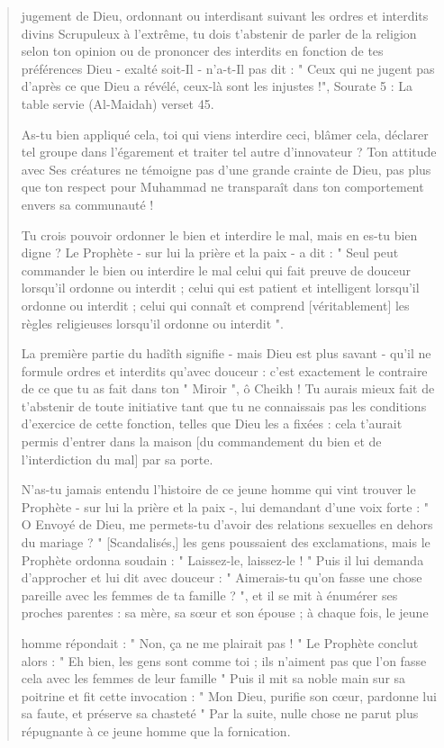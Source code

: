 \begin{quote}
jugement de Dieu, ordonnant ou interdisant suivant les ordres et
interdits divins Scrupuleux à l'extrême, tu dois t'abstenir de parler de
la religion selon ton opinion ou de prononcer des interdits en fonction
de tes préférences Dieu - exalté soit-Il - n'a-t-Il pas dit : " Ceux qui
ne jugent pas d'après ce que Dieu a révélé, ceux-là sont les injustes
!", Sourate 5 : La table servie (Al-Maidah) verset 45.

As-tu bien appliqué cela, toi qui viens interdire ceci, blâmer cela,
déclarer tel groupe dans l'égarement et traiter tel autre d'innovateur ?
Ton attitude avec Ses créatures ne témoigne pas d'une grande crainte de
Dieu, pas plus que ton respect pour Muhammad ne transparaît dans ton
comportement envers sa communauté !

Tu crois pouvoir ordonner le bien et interdire le mal, mais en es-tu
bien digne ? Le Prophète - sur lui la prière et la paix - a dit : " Seul
peut commander le bien ou interdire le mal celui qui fait preuve de
douceur lorsqu'il ordonne ou interdit ; celui qui est patient et
intelligent lorsqu'il ordonne ou interdit ; celui qui connaît et
comprend {[}véritablement{]} les règles religieuses lorsqu'il ordonne ou
interdit ".

La première partie du hadîth signifie - mais Dieu est plus savant -
qu'il ne formule ordres et interdits qu'avec douceur : c'est exactement
le contraire de ce que tu as fait dans ton " Miroir ", ô Cheikh ! Tu
aurais mieux fait de t'abstenir de toute initiative tant que tu ne
connaissais pas les conditions d'exercice de cette fonction, telles que
Dieu les a fixées : cela t'aurait permis d'entrer dans la maison {[}du
commandement du bien et de l'interdiction du mal{]} par sa porte.

N'as-tu jamais entendu l'histoire de ce jeune homme qui vint trouver le
Prophète - sur lui la prière et la paix -, lui demandant d'une voix
forte : " O Envoyé de Dieu, me permets-tu d'avoir des relations
sexuelles en dehors du mariage ? " {[}Scandalisés,{]} les gens
poussaient des exclamations, mais le Prophète ordonna soudain : "
Laissez-le, laissez-le ! " Puis il lui demanda d'approcher et lui dit
avec douceur : " Aimerais-tu qu'on fasse une chose pareille avec les
femmes de ta famille ? ", et il se mit à énumérer ses proches parentes :
sa mère, sa sœur et son épouse ; à chaque fois, le jeune

homme répondait : " Non, ça ne me plairait pas ! " Le Prophète conclut
alors : " Eh bien, les gens sont comme toi ; ils n'aiment pas que l'on
fasse cela avec les femmes de leur famille " Puis il mit sa noble main
sur sa poitrine et fit cette invocation : " Mon Dieu, purifie son cœur,
pardonne lui sa faute, et préserve sa chasteté " Par la suite, nulle
chose ne parut plus répugnante à ce jeune homme que la fornication.


\end{quote}

